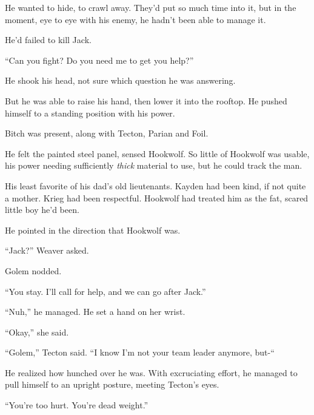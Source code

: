 He wanted to hide, to crawl away.  They'd put so much time into it, but in the moment, eye to eye with his enemy, he hadn't been able to manage it.



He'd failed to kill Jack.



``Can you fight?  Do you need me to get you help?''



He shook his head, not sure which question he was answering.



But he was able to raise his hand, then lower it into the rooftop.  He pushed himself to a standing position with his power.



Bitch was present, along with Tecton, Parian and Foil.



He felt the painted steel panel, sensed Hookwolf.  So little of Hookwolf was usable, his power needing sufficiently \emph{thick }material to use, but he could track the man.



His least favorite of his dad's old lieutenants.  Kayden had been kind, if not quite a mother.  Krieg had been respectful.  Hookwolf had treated him as the fat, scared little boy he'd been.



He pointed in the direction that Hookwolf was.



``Jack?'' Weaver asked.



Golem nodded.



``You stay.  I'll call for help, and we can go after Jack.''



``Nuh,'' he managed.  He set a hand on her wrist.



``Okay,'' she said.



``Golem,'' Tecton said.  ``I know I'm not your team leader anymore, but-``



He realized how hunched over he was.  With excruciating effort, he managed to pull himself to an upright posture, meeting Tecton's eyes.



``You're too hurt.  You're dead weight.''



